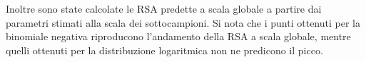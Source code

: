 Inoltre sono state calcolate le RSA predette a scala globale a partire dai parametri stimati alla scala dei sottocampioni. Si nota che i punti ottenuti per la binomiale negativa riproducono l'andamento della RSA a scala globale, mentre quelli ottenuti per la distribuzione logaritmica non ne predicono il picco.


